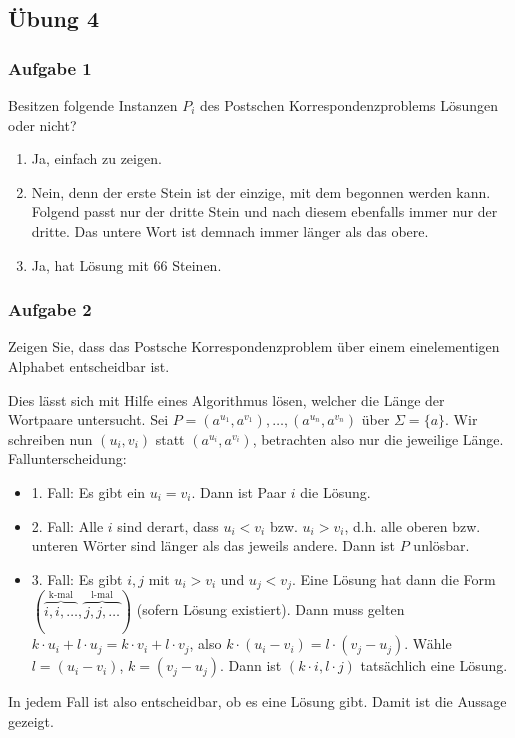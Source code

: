 \newpage

\subsection*{Übung 4}
\subsubsection*{Aufgabe 1}
    Besitzen folgende Instanzen $P_{i}$ des Postschen Korrespondenzproblems Lösungen oder nicht?
    \begin{enumerate}
        \item Ja, einfach zu zeigen.
        \item Nein, denn der erste Stein ist der einzige, mit dem begonnen werden kann. Folgend passt nur der dritte Stein und nach diesem ebenfalls immer nur der dritte. Das untere Wort ist demnach immer länger als das obere.
        \item Ja, hat Lösung mit 66 Steinen.
    \end{enumerate}


\subsubsection*{Aufgabe 2}
    Zeigen Sie, dass das Postsche Korrespondenzproblem über einem einelementigen Alphabet entscheidbar ist.

    \LOES Dies lässt sich mit Hilfe eines Algorithmus lösen, welcher die Länge der Wortpaare untersucht.
    Sei $P = (a^{u_{1}}, a^{v_{1}}), \dots, (a^{u_{n}}, a^{v_{n}})$ über $\Sigma = \{ a \}$. Wir schreiben nun $(u_{i}, v_{i})$ statt $(a^{u_{i}}, a^{v_{i}})$, betrachten also nur die jeweilige Länge. Fallunterscheidung:
    \begin{itemize}
        \item 1. Fall: Es gibt ein $u_{i} = v_{i}$. Dann ist Paar $i$ die Lösung.
        \item 2. Fall: Alle $i$ sind derart, dass $u_{i} < v_{i}$ bzw. $u_{i} > v_{i}$, d.h. alle oberen bzw. unteren Wörter sind länger als das jeweils andere. Dann ist $P$ unlösbar.
        \item 3. Fall: Es gibt $i, j$ mit $u_{i} > v_{i}$ und $u_{j} < v_{j}$. Eine Lösung hat dann die Form $(\overbrace{i,i,\dots}^\text{k-mal},\overbrace{j,j,\dots}^\text{l-mal})$ (sofern Lösung existiert). Dann muss gelten $k \cdot u_{i} + l \cdot u_{j} = k \cdot v_{i} + l \cdot v_{j}$, also $k \cdot (u_{i} - v_{i}) = l \cdot (v_{j} - u_{j})$. Wähle $l = (u_{i} - v_{i})$, $k = (v_{j} - u_{j})$. Dann ist $(k \cdot i, l \cdot j)$ tatsächlich eine Lösung.
    \end{itemize}
    In jedem Fall ist also entscheidbar, ob es eine Lösung gibt. Damit ist die Aussage gezeigt.


